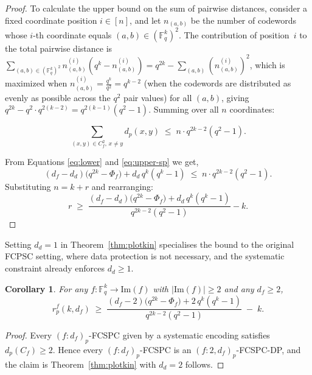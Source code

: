 \documentclass[11pt,draftclsnofoot,journal,onecolumn]{IEEEtran}
\newtheorem{corollary}{Corollary}
\begin{document}
\begin{proof}
 
    \medskip
    \noindent
    To calculate the upper bound on the sum of pairwise distances, consider a fixed coordinate position $i\in[n]$, and let $n_{ (a,b)}$ be the number of
    codewords whose $i$-th coordinate equals $(a,b)\in(\mathbb{F}_q^k)^2$.  The contribution of position~$i$ to the total pairwise distance is
    $\sum_{(a,b)\in(\mathbb{F}_q^k)^2} n_{(a,b)}^{(i)}(q^{k} - n_{(a,b)}^{(i)}) = q^{2k} - \sum_{(a,b)} (n_{(a,b)}^{(i)})^2$, which is maximized when $n_{(a,b)}^{(i)} = \frac{q^k}{q^2} = q^{k-2}$ (when the codewords are distributed as evenly as possible across the $q^2$
    pair values) for all $(a,b)$, giving $q^{2k} - q^2\cdot q^{2(k-2)} = q^{2(k-1)}(q^2-1)$.
    Summing over all $n$ coordinates:

    \begin{equation}\label{eq:upper-sp}
    \sum_{(x, y) \in {C}_f^2,\, x \neq y} d_p(x, y)
    \;\leq\; n \cdot q^{2k - 2} (q^2 - 1).
    \end{equation}
    \medskip

 
    From Equations \eqref{eq:lower} and \eqref{eq:upper-sp} we get,
    \[
    (d_f-d_d)\bigl(q^{2k}-\Phi_f\bigr) + d_d\,q^k(q^k-1)
    \;\leq\;
    n \cdot q^{2k - 2} (q^2 - 1).
    \]
    Substituting $n = k+r$ and rearranging:
    \[
        r
    \;\geq \;
    \frac{(d_f-d_d)\bigl(q^{2k}-\Phi_f\bigr) + d_d\,q^k(q^k-1)}
       { q^{2k - 2} (q^2 - 1)} - k.
    \]
    \end{proof}

    \noindent
    Setting $d_d = 1$ in Theorem~\ref{thm:plotkin} specialises the bound to the original FCPSC setting, where data protection is not necessary, and the systematic constraint already enforces $d_d \geq 1$.

    

    \begin{corollary}
    \label{cor:plotkin-fcspc}
    For any $f : \mathbb{F}_q^{k} \to \mathrm{Im}(f)$ with $|\mathrm{Im}(f)| \ge 2$ and any $d_f \ge 2$,
    \[
    r_p^f(k, d_f) \;\ge\;
    \frac{(d_f-2)\bigl(q^{2k}-\Phi_f\bigr) + 2\,q^{k}(q^{k}-1)}
         {q^{2k-2}(q^{2}-1)} \;-\; k .
    \]
    \end{corollary}

    \begin{proof}
    Every $(f : d_f)_p$-FCSPC given by a systematic encoding satisfies $d_p(C_f) \ge 2$. Hence every $(f : d_f)_p$-FCSPC is an $(f : 2, d_f)_p$-FCSPC-DP, and the claim is Theorem~\ref{thm:plotkin} with $d_d = 2$ follows.
    \end{proof}
\end{document}
